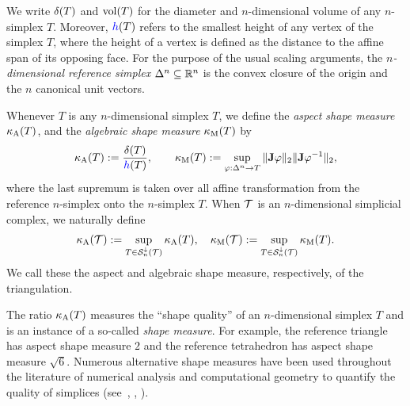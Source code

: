 \documentclass[10pt,a4paper]{article}
\begin{document}
We write ${\delta}(T)$ and $\operatorname{vol}(T)$ for the diameter and $n$-dimensional volume of any $n$-simplex $T$.
Moreover, $\height(T)$ refers to the smallest height of any vertex of the simplex $T$,
where the height of a vertex is defined as the distance to the affine span of its opposing face.
For the purpose of the usual scaling arguments, the \emph{$n$-dimensional reference simplex} $\Delta^n \subseteq {\mathbb R}^n$ is the convex closure of the origin and the $n$ canonical unit vectors. 



Whenever $T$ is any $n$-dimensional simplex $T$,
we define the \emph{aspect shape measure} $\kappa_{\rm A}(T)$,
and 
the \emph{algebraic shape measure} $\kappa_{\rm M}(T)$
by 
\begin{align}\label{math:shapemeasure}
    \aspectratio(T)
    := 
    \frac{ \diam(T) }{ \height(T) }
    ,
    \qquad 
    \algebraicshapemeasure(T)
    := 
    \sup_{ \varphi : \Delta^n \rightarrow T } 
    \matnorm{\Jacobian \varphi} \matnorm{ \Jacobian \varphi^{-1} }
    ,
\end{align}
where the last supremum is taken over all affine transformation from the reference $n$-simplex onto the $n$-simplex $T$. 
When ${\mathcal T}$ is an $n$-dimensional simplicial complex, we naturally define 
\begin{align}\label{math:shapemeasure:triangulation}
    \kappa_{\rm A}({\mathcal T}) := \sup_{ T \in {\mathcal S}^{\downarrow}_{n}({\mathcal T}) } \kappa_{\rm A}(T)
    ,
    \quad 
    \kappa_{\rm M}({\mathcal T}) := \sup_{ T \in {\mathcal S}^{\downarrow}_{n}({\mathcal T}) } \kappa_{\rm M}(T)
    .
\end{align}
We call these the aspect and algebraic shape measure, respectively, of the triangulation. 

\begin{remark}
    The ratio $\kappa_{\rm A}(T)$ measures the ``shape quality'' of an $n$-dimensional simplex $T$ and is an instance of a so-called \emph{shape measure}.
    For example, the reference triangle has aspect shape measure $2$ and the reference tetrahedron has aspect shape measure $\sqrt{6}$. 
    Numerous alternative shape measures have been used throughout the literature of numerical analysis and computational geometry to quantify the quality of simplices (see~\cite[p.61, Definition 5.1]{braess2001finite}, 
    \cite[p.97, Definition {\char`\(}4.2.16{\char`\)} ]{brenner2008mathematical}, %
    \cite[Definition~11.2]{ern2021finite}). 
\end{remark}
\end{document}
